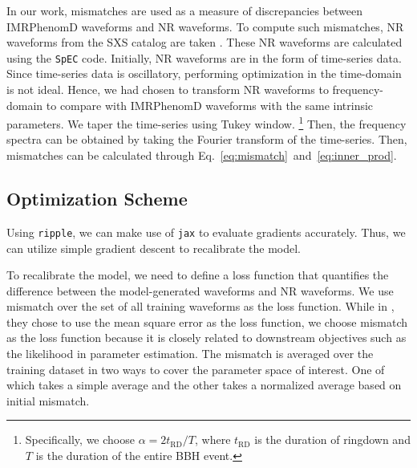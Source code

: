 \documentclass[twocolumn]{aastex631}
\newcommand{\ripple}{\texttt{ripple}}
\newcommand{\jax}{\texttt{jax}}
\begin{document}
In our work, mismatches are used as a measure of discrepancies between IMRPhenomD waveforms and NR waveforms. To compute such mismatches, NR waveforms from the SXS catalog are taken \citep{boyle2019sxs}. These NR waveforms are calculated using the \texttt{SpEC} code. Initially, NR waveforms are in the form of time-series data. Since time-series data is oscillatory, performing optimization in the time-domain is not ideal. Hence, we had chosen to transform NR waveforms to frequency-domain to compare with IMRPhenomD waveforms with the same intrinsic parameters. We taper the time-series using Tukey window. 
\footnote{
	Specifically, we choose $\alpha=2t_{\mathrm{RD}}/T$, where $t_{\mathrm{RD}}$ is the duration of ringdown and $T$ is the duration of the entire BBH event. 
} 
Then, the frequency spectra can be obtained by taking the Fourier transform of the time-series. Then, mismatches can be calculated through Eq.~\ref{eq:mismatch}~and~\ref{eq:inner_prod}. 

\subsection{Optimization Scheme} \label{subsec:optimization}

Using \ripple, we can make use of {\jax} to evaluate gradients accurately. Thus, we can utilize simple gradient descent to recalibrate the model. 



To recalibrate the model, we need to define a loss function that quantifies the difference between the model-generated waveforms and NR waveforms. We use mismatch over the set of all training waveforms as the loss function. While in \citep{khan2016frequency}, they chose to use the mean square error as the loss function, we choose mismatch as the loss function because it is closely related to downstream objectives such as the likelihood in parameter estimation. The mismatch is averaged over the training dataset in two ways to cover the parameter space of interest. One of which takes a simple average and the other takes a normalized average based on initial mismatch.
\end{document}
